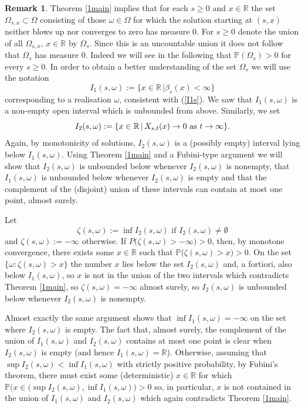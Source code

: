 \documentclass[sn-mathphys-num]{sn-jnl}
\theoremstyle{definition}
\newtheorem{rem}[thm]{Remark}
\numberwithin{equation}{section} \theoremstyle{remark}
\def\R{\mathbb R}
\def\RR{\mathscr R}
\def\P{\mathbb P}
\newcommand{\1}{\mathbbm{1}}
\begin{document}
\begin{rem}\label{theremark}
  Theorem \ref{1main} implies that for each $s \geq 0$ and $x \in \R$
  the set $\Omega_{s,x}\subset \Omega$ consisting of those
  $\omega \in \Omega$ for which the solution starting at $(s,x)$
  neither blows up nor converges to zero has measure 0. For $s\geq 0$
  denote the union of all $\Omega_{s,x},\,x \in \R$ by $\Omega_s$.
  Since this is an uncountable union it does not follow that
  $\Omega_s$ has measure 0. Indeed we will see in the following that
  $\P(\Omega_s)>0$ for every $s \geq 0$. In order to obtain a better
  understanding of the set $\Omega_s$ we will use the notation
  $$
  I_1(s,\omega):=\{x \in \R\, |\beta_s(x)<\infty\}
  $$
  corresponding to a realisation $\omega$, consistent with
  (\ref{I1s}). We saw that $I_1(s,\omega)$ is a non-empty open interval
  which is unbounded from above.  Similarly, we set
  \begin{equation}\label{I2s}
    I_2(s, \omega) := \{ x \in \R \, | \,  X_{s,t}(x) \rightarrow  0
    \hbox{ as } t \rightarrow \infty\}.
  \end{equation}
  Again, by monotonicity of solutions, $I_2(s,\omega)$ is a (possibly
  empty) interval lying below $I_1(s,\omega)$. Using Theorem
  \ref{1main} and a Fubini-type argument we will show that
  $I_2(s,\omega)$ is unbounded below whenever $I_2(s,\omega)$ is
  nonempty, that $I_1(s,\omega)$ is unbounded below whenever
  $I_2(s,\omega)$ is empty and that the complement of the (disjoint)
  union of these intervals can contain at most one point, almost
  surely.

  Let
  $$
\zeta(s,\omega):=\inf I_2(s,\omega) \mbox{ if } I_2(s,\omega)\neq \emptyset
$$
and $\zeta(s,\omega):=-\infty$ otherwise. If
$P\big(\zeta(s,\omega)>-\infty\big)>0$, then, by monotone convergence,
there exists some $x \in \R$ such that
$\P\big(\zeta(s,\omega)>x\big)>0$. On the set
$\{\omega: \zeta(s,\omega)>x\}$ the number $x$ lies below the set
$I_2(s,\omega)$ and, a fortiori, also below $I_1(s,\omega)$, so $x$ is
not in the union of the two intervals which contradicts Theorem
\ref{1main}, so $\zeta(s,\omega)=-\infty$ almost surely, so
$I_2(s,\omega)$ is unbounded below whenever $I_2(s,\omega)$ is
nonempty.

Almost exactly the same argument shows that $\inf I_1(s,\omega)=-\infty$ on the set where   $I_2(s,\omega)$ is empty. The fact that, almost surely,  the complement of the union of $I_1(s,\omega)$ and  $I_2(s,\omega)$
contains at most one point is clear when $I_2(s,\omega)$ is empty (and hence $I_1(s,\omega)=\R$). Otherwise, assuming that $\sup I_2(s,\omega)<\inf I_1(s,\omega)$ with strictly positive probability, by Fubini's theorem, there must
exist some (deterministic) $x \in \R$ for which $\P\big(x \in \big(\sup I_2(s,\omega),\inf I_1(s,\omega)\big)>0$ so, in particular, $x$ is not contained in the union of $I_1(s,\omega)$ and $I_2(s,\omega)$ which again contradicts Theorem \ref{1main}. 
 




\end{rem}
\end{document}
